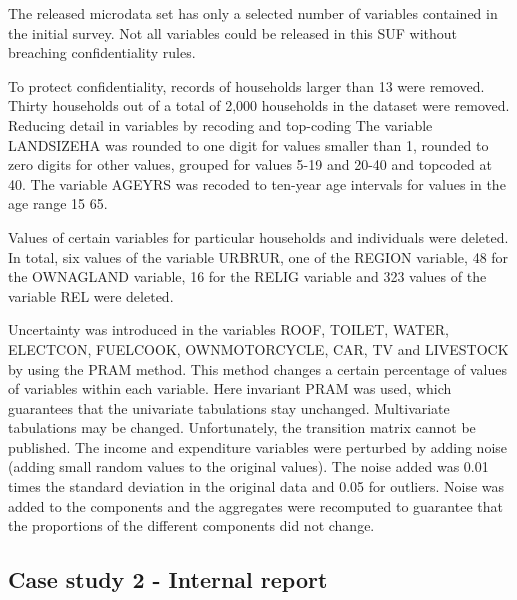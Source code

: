\documentclass[letterpaper,10pt,english]{sphinxmanual}
\begin{document}

The released microdata set has only a selected number of variables contained in the initial survey. Not all variables could be released in this SUF without breaching confidentiality rules.


To protect confidentiality, records of households larger than 13 were removed. Thirty households out of a total of 2,000 households in the dataset were removed.
Reducing detail in variables by recoding and top-coding
The variable LANDSIZEHA was rounded to one digit for values smaller than 1, rounded to zero digits for other values, grouped for values 5-19 and 20-40 and topcoded at 40. The variable AGEYRS was recoded to ten-year age intervals for values in the age range 15 \textendash{} 65.


Values of certain variables for particular households and individuals were deleted. In total, six values of the variable URBRUR, one of the REGION variable, 48 for the OWNAGLAND variable, 16 for the RELIG variable and 323 values of the variable REL were deleted.


Uncertainty was introduced in the variables ROOF, TOILET, WATER, ELECTCON, FUELCOOK, OWNMOTORCYCLE, CAR, TV and LIVESTOCK by using the PRAM method. This method changes a certain percentage of values of variables within each variable. Here invariant PRAM was used, which guarantees that the univariate tabulations stay unchanged. Multivariate tabulations may be changed. Unfortunately, the transition matrix cannot be published.
The income and expenditure variables were perturbed by adding noise (adding small random values to the original values). The noise added was 0.01 times the standard deviation in the original data and 0.05 for outliers. Noise was added to the components and the aggregates were recomputed to guarantee that the proportions of the different components did not change.


\subsection{Case study 2 - Internal report}
\label{\detokenize{appendices:case-study-2-internal-report}}
\end{document}
